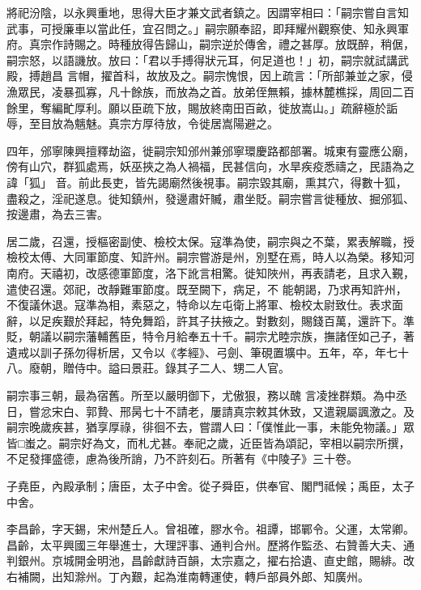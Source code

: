 \begin{pinyinscope}
 將祀汾陰，以永興重地，思得大臣才兼文武者鎮之。因謂宰相曰：「嗣宗嘗自言知武事，可授廉車以當此任，宜召問之。」嗣宗願奉詔，即拜耀州觀察使、知永興軍府。真宗作詩賜之。時種放得告歸山，嗣宗逆於傳舍，禮之甚厚。放既醉，稍倨，嗣宗怒，以語譏放。放曰：「君以手搏得狀元耳，何足道也！」初，嗣宗就試講武殿，搏趙昌
 言帽，擢首科，故放及之。嗣宗愧恨，因上疏言：「所部兼並之家，侵漁眾民，凌暴孤寡，凡十餘族，而放為之首。放弟侄無賴，據林麓樵採，周回二百餘里，奪編甿厚利。願以臣疏下放，賜放終南田百畝，徙放嵩山。」疏辭極於詬辱，至目放為魑魅。真宗方厚待放，令徙居嵩陽避之。



 四年，邠寧陳興擅釋劫盜，徙嗣宗知邠州兼邠寧環慶路都部署。城東有靈應公廟，傍有山穴，群狐處焉，妖巫挾之為人禍福，民甚信向，水旱疾疫悉禱之，民語為之諱「狐」
 音。前此長吏，皆先謁廟然後視事。嗣宗毀其廟，熏其穴，得數十狐，盡殺之，淫祀遂息。徙知鎮州，發邊肅奸贓，肅坐貶。嗣宗嘗言徙種放、掘邠狐、按邊肅，為去三害。



 居二歲，召還，授樞密副使、檢校太保。寇準為使，嗣宗與之不葉，累表解職，授檢校太傅、大同軍節度、知許州。嗣宗嘗游是州，別墅在焉，時人以為榮。移知河南府。天禧初，改感德軍節度，洛下訛言相驚。徙知陜州，再表請老，且求入覲，遣使召還。郊祀，改靜難軍節度。既至闕下，病足，不
 能朝謁，乃求再知許州，不復議休退。寇準為相，素惡之，特命以左屯衛上將軍、檢校太尉致仕。表求面辭，以足疾艱於拜起，特免舞蹈，許其子扶掖之。對數刻，賜錢百萬，還許下。準貶，朝議以嗣宗藩輔舊臣，特令月給奉五十千。嗣宗尤睦宗族，撫諸侄如己子，著遺戒以訓子孫勿得析居，又令以《孝經》、弓劍、筆硯置壙中。五年，卒，年七十八。廢朝，贈侍中。謚曰景莊。錄其子二人、甥二人官。



 嗣宗事三朝，最為宿舊。所至以嚴明御下，尤傲狠，務以醜
 言凌挫群類。為中丞日，嘗忿宋白、郭贄、邢昺七十不請老，屢請真宗敕其休致，又遣親屬諷激之。及嗣宗晚歲疾甚，猶享厚祿，徘徊不去，嘗謂人曰：「僕惟此一事，未能免物議。」眾皆□蚩之。嗣宗好為文，而札尤甚。奉祀之歲，近臣皆為頌記，宰相以嗣宗所撰，不足發揮盛德，慮為後所誚，乃不許刻石。所著有《中陵子》三十卷。



 子堯臣，內殿承制；唐臣，太子中舍。從子舜臣，供奉官、閣門祗候；禹臣，太子中舍。



 李昌齡，字天錫，宋州楚丘人。曾祖確，膠水令。祖譚，邯鄲令。父運，太常卿。昌齡，太平興國三年舉進士，大理評事、通判合州。歷將作監丞、右贊善大夫、通判銀州。京城開金明池，昌齡獻詩百韻，太宗嘉之，擢右拾遺、直史館，賜緋。改右補闕，出知滁州。丁內艱，起為淮南轉運使，轉戶部員外郎、知廣州。




\end{pinyinscope}
